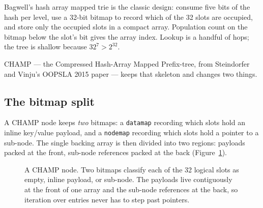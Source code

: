 \documentclass[11pt,twoside,openright]{book}
\newcommand{\code}[1]{\texorpdfstring{\textcolor{d7ink}{\texttt{#1}}}{#1}}
\begin{document}
Bagwell's hash array mapped trie is the classic design: consume five bits of the
hash per level, use a 32-bit bitmap to record which of the 32 slots are
occupied, and store only the occupied slots in a compact array. Population count
on the bitmap below the slot's bit gives the array index. Lookup is a handful of
hops; the tree is shallow because $32^7 > 2^{32}$.

CHAMP --- the Compressed Hash-Array Mapped Prefix-tree, from Steindorfer and
Vinju's OOPSLA 2015 paper --- keeps that skeleton and changes two things.

\subsection{The bitmap split}

A CHAMP node keeps \emph{two} bitmaps: a \code{datamap} recording which slots
hold an inline key/value payload, and a \code{nodemap} recording which slots
hold a pointer to a sub-node. The single backing array is then divided into two
regions: payloads packed at the front, sub-node references packed at the back
(Figure~\ref{fig:champnode}).

\begin{figure}[htbp]
\centering
{}
\caption{A CHAMP node. Two bitmaps classify each of the 32 logical slots as
empty, inline payload, or sub-node. The payloads live contiguously at the front
of one array and the sub-node references at the back, so iteration over entries
never has to step past pointers.}
\label{fig:champnode}
\end{figure}
\end{document}
